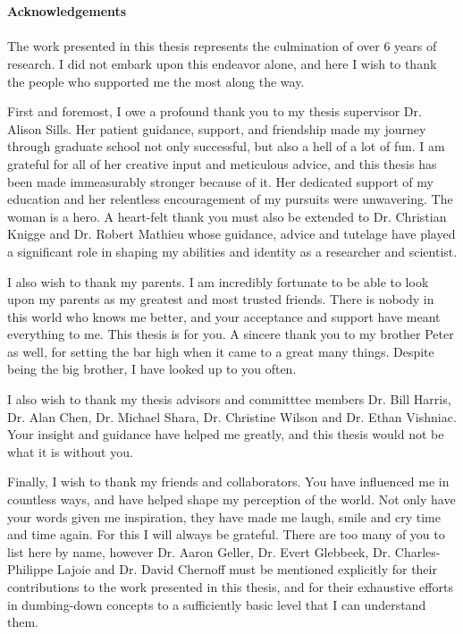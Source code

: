 \thispagestyle{fancy}

\textrm{}\\\\
\noindent\textbf{\huge\textsf{Acknowledgements}}\\\\

\noindent The work presented in this thesis represents the culmination
of over 6 years of research.  I did not embark upon this endeavor
alone, and here I wish to thank the people who supported me the most
along the way.

First and foremost, I owe a profound thank you to my thesis
supervisor Dr. Alison Sills. Her patient guidance, support, and
friendship made my journey through graduate school not only
successful, but also a hell of a lot of fun.  
I am grateful for all of her creative input and meticulous advice, and
this thesis has been made immeasurably stronger because of it.  Her
dedicated support of my education and her relentless encouragement of
my pursuits were unwavering.  The woman is a hero.  A heart-felt thank
you must also be extended to Dr. Christian Knigge and Dr. Robert
Mathieu whose guidance, advice and tutelage have played a significant
role in shaping my abilities and identity as a researcher and scientist.

I also wish to thank my parents.  I am incredibly fortunate to be able
to look upon my parents as my greatest and most trusted friends.
There is nobody in this world who 
knows me better, and your acceptance and support have meant everything
to me.  This thesis is for you.  A sincere thank you to my brother
Peter as well, for setting 
the bar high when it came to a great many things.  Despite being the
big brother, I have looked up to you often.

I also wish to thank my thesis advisors and committtee members
Dr. Bill Harris, Dr. Alan Chen, Dr. Michael Shara, Dr. Christine
Wilson and Dr. Ethan Vishniac.  Your insight and guidance
have helped me greatly, and this thesis would not be what it is 
without you.

Finally, I wish to thank my friends and collaborators.  You have
influenced me in countless ways, and have helped shape my perception
of the world.  Not only have your words given me inspiration, they
have made me laugh, smile and cry time and time again.  For this
I will always be grateful.  There are too many of you to list here by
name, however Dr. Aaron Geller, 
Dr. Evert Glebbeek, Dr. Charles-Philippe Lajoie and Dr. David
Chernoff must be mentioned 
explicitly for their contributions to the work presented in this
thesis, and for their exhaustive efforts in dumbing-down concepts to a
sufficiently basic level that I can understand them.   
